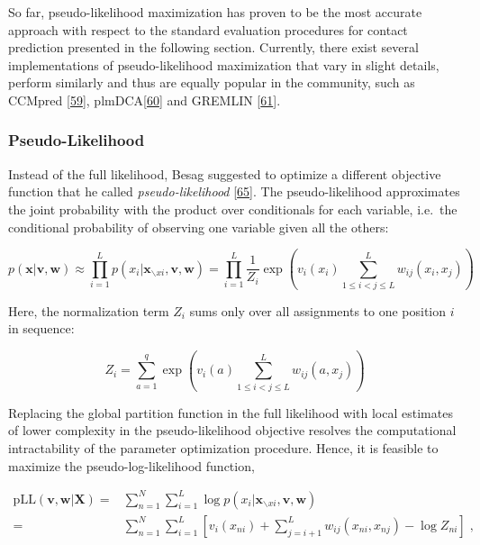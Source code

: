 \documentclass[12pt,a4paper,twoside]{book}
\newcommand{\seq}{\mathbf{x}}
\renewcommand{\v}{\mathbf{v}}
\newcommand{\w}{\mathbf{w}}
\theoremstyle{definition}
\theoremstyle{definition}
\theoremstyle{remark}
\begin{document}
So far, pseudo-likelihood maximization has proven to be the most
accurate approach with respect to the standard evaluation procedures for
contact prediction presented in the following section. Currently, there
exist several implementations of pseudo-likelihood maximization that
vary in slight details, perform similarly and thus are equally popular
in the community, such as CCMpred
{[}\protect\hyperlink{ref-Seemayer2014}{59}{]},
plmDCA{[}\protect\hyperlink{ref-Ekeberg2014}{60}{]} and GREMLIN
{[}\protect\hyperlink{ref-Kamisetty2013}{61}{]}.

\subsubsection{Pseudo-Likelihood}\label{pseudo-likelihood}

Instead of the full likelihood, Besag suggested to optimize a different
objective function that he called \emph{pseudo-likelihood}
{[}\protect\hyperlink{ref-Besag1975}{65}{]}. The pseudo-likelihood
approximates the joint probability with the product over conditionals
for each variable, i.e.~the conditional probability of observing one
variable given all the others:

\begin{equation}
  p(\seq | \v,\w) \approx   \prod_{i=1}^L p(x_i | \seq_{\backslash xi}, \v,\w) =  \prod_{i=1}^L \frac{1}{Z_i} \exp \left(  v_i(x_i) \sum_{1 \leq i < j \leq L}^L w_{ij}(x_i, x_j) \right)
\end{equation}

Here, the normalization term \(Z_i\) sums only over all assignments to
one position \(i\) in sequence:

\begin{equation}
  Z_i = \sum_{a=1}^{q} \exp \left( v_i(a) \sum_{1 \leq i < j \leq L}^L w_{ij}(a, x_j) \right)
\label{eq:partition-fct-pll}
\end{equation}

Replacing the global partition function in the full likelihood with
local estimates of lower complexity in the pseudo-likelihood objective
resolves the computational intractability of the parameter optimization
procedure. Hence, it is feasible to maximize the pseudo-log-likelihood
function,

\begin{align}
    \text{pLL}(\v, \w | \mathbf{X}) =& \sum_{n=1}^N \sum_{i=1}^L \log p(x_i | \seq_{\backslash xi}, \v,\w) \\
    =& \sum_{n=1}^N \sum_{i=1}^L  \left[ v_i(x_{ni}) + \sum_{j=i+1}^L  w_{ij}(x_{ni}, x_{nj}) - \log Z_{ni} \right] \;,
\end{align}
\end{document}
